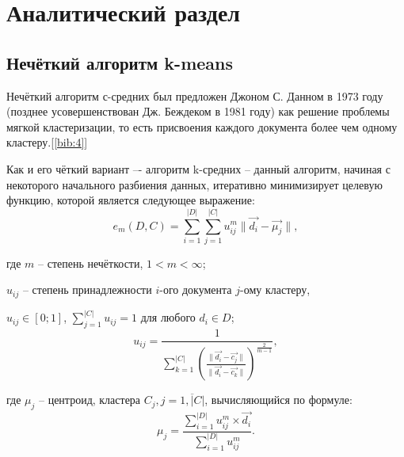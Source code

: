 \chapter{Аналитический раздел}
\label{cha:analytical}
    \section{Нечёткий алгоритм k-means}
\par Нечёткий алгоритм с-средних был предложен Джоном С. Данном в 1973 году (позднее усовершенствован Дж. Беждеком в 1981 году) как решение проблемы мягкой кластеризации, то есть присвоения каждого документа более чем одному кластеру.[\ref{bib:4}]
\par Как и его чёткий вариант –- алгоритм k-средних -- данный алгоритм, начиная с некоторого начального разбиения данных, итеративно минимизирует целевую функцию, которой является следующее выражение:
\begin{equation}\label{formula:func}
	e_m(D,C) = \sum_{i=1}^{|D|} \sum_{j=1}^{|C|} u_{ij}^{m} \|\vec{d_i} - \vec{\mu_j}\|,
\end{equation}
\par где \begin{math}m\end{math} -- степень нечёткости, \begin{math}1 < m < \infty\end{math};
\par \begin{math}u_{ij}\end{math} -- степень принадлежности \begin{math}i\end{math}-ого документа \begin{math}j\end{math}-ому кластеру,
\par \begin{math}u_{ij} \in [0;1]\end{math}, \begin{math}\sum_{j=1}^{|C|} u_{ij} = 1\end{math} для любого \begin{math}d_i \in D\end{math};
\begin{equation}\label{formula:func_1}
	u_{ij} = \frac {1}{\sum_{k=1}^{|C|} (\frac{\|\vec{d_i} - \vec{c_j}\|}{\|\vec{d_i} - \vec{c_k}\|})^{\frac{2}{m-1}}},
\end{equation}
\par где \begin{math}\mu_{j}\end{math} -- центроид, кластера \begin{math}C_{j}, j = \overline{1,|C|}\end{math}, вычисляющийся по формуле:
\begin{equation}\label{formula:func_2}
	\mu_{j} = \frac {\sum_{i=1}^{|D|} u_{ij}^m \times \vec{d_i}}{\sum_{i=1}^{|D|} u_{ij}^m}.
\end{equation}
